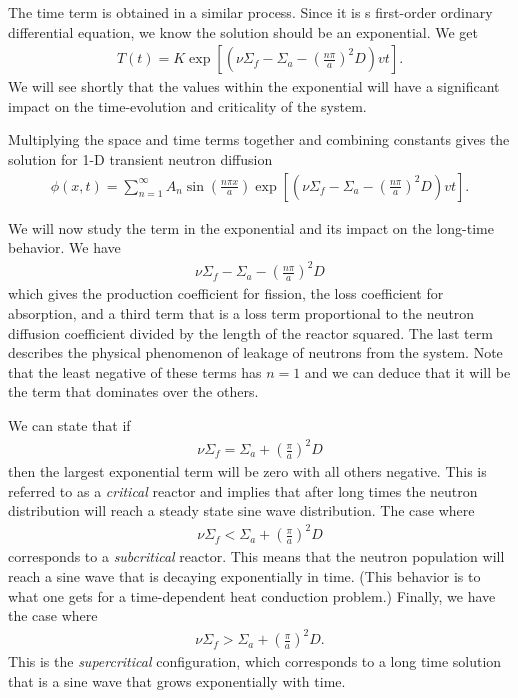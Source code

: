 The time term is obtained in a similar process. Since it is s first-order ordinary differential equation, we know the solution should be an exponential. We get
\begin{align}
  T(t) = K \exp \left[ \left( \nu \Sigma_f - \Sigma_a - \left( \frac{n \pi}{a} \right)^2 D \right) vt \right] .
\end{align}
We will see shortly that the values within the exponential will have a significant impact on the time-evolution and criticality of the system. 

Multiplying the space and time terms together and combining constants gives the solution for 1-D transient neutron diffusion
\begin{align}
  \phi(x,t) = \sum_{n=1}^\infty A_n \sin \left( \frac{ n \pi x }{ a } \right) \exp \left[ \left( \nu \Sigma_f - \Sigma_a - \left( \frac{n \pi}{a} \right)^2 D \right) v t \right]  . \label{Eq:neutronics_timeDependentScalarFlux_1DSlabDiffusion}
\end{align}

We will now study the term in the exponential and its impact on the long-time behavior. We have
\begin{align}
   \nu \Sigma_f - \Sigma_a - \left( \frac{n \pi}{a} \right)^2 D \nonumber
\end{align}
which gives the production coefficient for fission, the loss coefficient for absorption, and a third term that is a loss term proportional to the neutron diffusion coefficient divided by the length of the reactor squared. The last term describes the physical phenomenon of leakage of neutrons from the system. Note that the least negative of these terms has $n = 1$ and we can deduce that it will be the term that dominates over the others. 

We can state that if
\begin{align}
  \nu \Sigma_f = \Sigma_a + \left( \frac{\pi}{a} \right)^2 D  \nonumber
\end{align}
then the largest exponential term will be zero with all others negative. This is referred to as a \emph{critical} reactor and implies that after long times the neutron distribution will reach a steady state sine wave distribution. The case where
\begin{align}
  \nu \Sigma_f < \Sigma_a + \left( \frac{\pi}{a} \right)^2 D  \nonumber
\end{align}
corresponds to a \emph{subcritical} reactor. This means that the neutron population will reach a sine wave that is decaying exponentially in time. (This behavior is to what one gets for a time-dependent heat conduction problem.) Finally, we have the case where
\begin{align}
  \nu \Sigma_f > \Sigma_a + \left( \frac{\pi}{a} \right)^2 D . \nonumber
\end{align}
This is the \emph{supercritical} configuration, which corresponds to a long time solution that is a sine wave that grows exponentially with time. 

